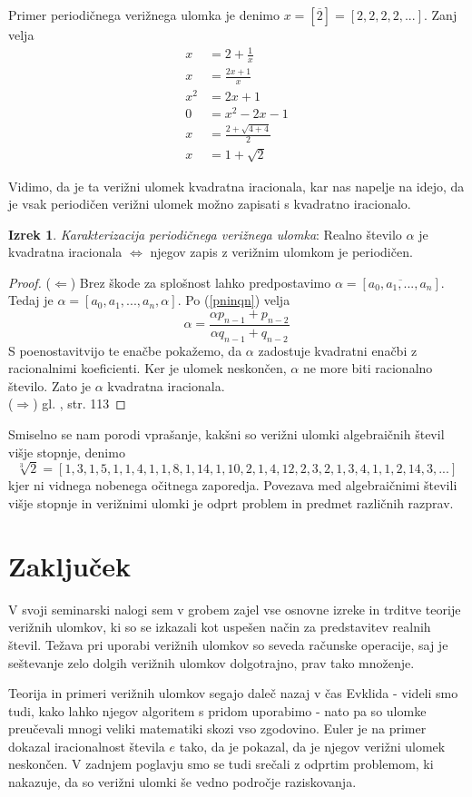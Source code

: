 \documentclass[a4paper,12pt]{article}
\theoremstyle{definition}
\theoremstyle{proposition}
\theoremstyle{theorem}
\newtheorem{iz}{Izrek}[section]
\theoremstyle{lemma}
\begin{document}
Primer periodičnega verižnega ulomka je denimo $x = [\overline{2}] =[2,2,2,2,...]$. Zanj velja
\begin{align*}
x&= 2 + \frac{1}{x} \\
x&= \frac{2x+1}{x} \\
x^2&= 2x+1 \\
0&=x^2-2x-1\\
x&=\frac{2+\sqrt{4+4}}{2}\\
x&=1+\sqrt{2}
\end{align*}

Vidimo, da je ta verižni ulomek kvadratna iracionala, kar nas napelje na idejo, da je vsak periodičen verižni ulomek možno zapisati s kvadratno iracionalo.

\begin{iz}
\label{periodicni}
\textit{Karakterizacija periodičnega verižnega ulomka}: Realno število $\alpha$ je kvadratna iracionala $\Leftrightarrow$ njegov zapis z verižnim ulomkom je periodičen.
\end{iz}
\begin{proof}
($\Leftarrow$) Brez škode za splošnost lahko predpostavimo $\alpha = [\overline{a_0, a_1, ..., a_n}]$. Tedaj je $\alpha = [a_0, a_1, ..., a_n, \alpha]$. Po (\ref{pninqn}) velja \[ \alpha = \frac{\alpha p_{n-1} + p_{n-2}}{\alpha q_{n-1} + q_{n-2}} \]
S poenostavitvijo te enačbe pokažemo, da $\alpha$ zadostuje kvadratni enačbi z racionalnimi koeficienti. Ker je ulomek neskončen, $\alpha$ ne more biti racionalno število. Zato je $\alpha$ kvadratna iracionala.\\
($\Rightarrow$) gl. \cite{teorijastevil}, str. 113
\end{proof}

Smiselno se nam porodi vprašanje, kakšni so verižni ulomki algebraičnih števil višje stopnje, denimo $$\sqrt[3]{2} =[1, 3, 1, 5, 1, 1, 4, 1, 1, 8, 1, 14, 1, 10, 2, 1, 4, 12, 2, 3, 2, 1, 3, 4, 1, 1, 2, 14,
3, ...]$$
kjer ni vidnega nobenega očitnega zaporedja. Povezava med algebraičnimi števili višje stopnje in verižnimi ulomki je odprt problem in predmet različnih razprav.
\newpage

\section{Zaključek}

V svoji seminarski nalogi sem v grobem zajel vse osnovne izreke in trditve teorije verižnih ulomkov, ki so se izkazali kot uspešen način za predstavitev realnih števil. Težava pri uporabi verižnih ulomkov so seveda računske operacije, saj je seštevanje zelo dolgih verižnih ulomkov dolgotrajno, prav tako množenje.\par
Teorija in primeri verižnih ulomkov segajo daleč nazaj v čas Evklida - videli smo tudi, kako lahko njegov algoritem s pridom uporabimo - nato pa so ulomke preučevali mnogi veliki matematiki skozi vso zgodovino. Euler je na primer dokazal iracionalnost števila $e$ tako, da je pokazal, da je njegov verižni ulomek neskončen. V zadnjem poglavju smo se tudi srečali z odprtim problemom, ki nakazuje, da so verižni ulomki še vedno področje raziskovanja.\par
\end{document}
